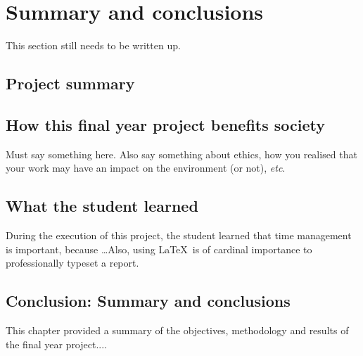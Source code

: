 \def\baselinestretch{1}
\chapter{Summary and conclusions}
\label{ch:Conclusions}

\graphicspath{{Conclusions/Figures_Conclusions/}}

This section still needs to be written up.

\section{Project summary}

\section{How this final year project benefits society}
Must say something here. Also say something about ethics, how you realised that your work may have an impact on the environment (or not), \textit{etc}.

\section{What the student learned}
During the execution of this project, the student learned that time management is important, because \ldots Also, using \LaTeX \ is of cardinal importance to professionally typeset a report.

\section{Conclusion: Summary and conclusions}

This chapter provided a summary of the objectives, methodology and results of the final year project....
